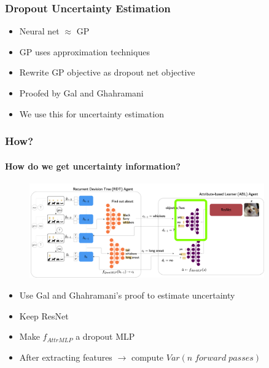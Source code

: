 \documentclass[9pt]{beamer}
\begin{document}
\begin{frame}
\frametitle{Dropout Uncertainty Estimation \cite{gal2016dropout}}
\begin{itemize}
	\item Neural net $\approx$ GP
	\item GP uses approximation techniques
	\item Rewrite GP objective as dropout net objective
	\item Proofed by Gal and Ghahramani \cite{gal2016dropout} 
	\item We use this for uncertainty estimation
\end{itemize}
\end{frame}


\begin{frame}
\frametitle{How?}
\framesubtitle{How do we get uncertainty information?}\begin{figure}
	\centering
	\includegraphics[width=0.9\textwidth]{images/where_is_uncertainty.pdf} 
\end{figure}
\begin{itemize}
	\item Use Gal and Ghahramani's \cite{gal2016dropout} proof to estimate uncertainty 
	\item Keep ResNet
	\item Make $f_{AttrMLP}$ a dropout MLP
	\item After extracting features $\rightarrow$ compute $Var(n \;forward\;passes)$
\end{itemize}
\end{frame}
\end{document}
